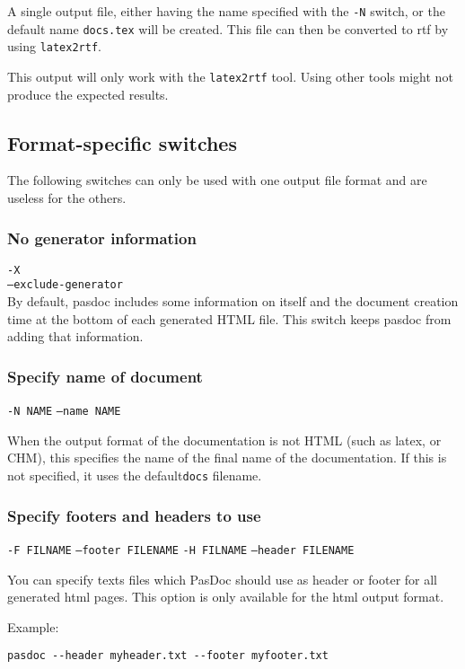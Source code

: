 \documentclass[11pt]{article}
\begin{document}
A single output file, either having the name specified with
the {\tt -N} switch, or the default name {\tt docs.tex} will
be created. This file can then be converted to rtf by using
{\tt latex2rtf}.

This output will only work with the {\tt latex2rtf} tool. Using
other tools might not produce the expected results. 

\subsection{Format-specific switches}

The following switches can only be used with one output file format
and are useless for the others.

\subsubsection{No generator information}

{\tt -X}\\
{\tt --exclude-generator}\\

By default, pasdoc includes some information on itself and the document
creation time at the bottom of each generated HTML file.
This switch keeps pasdoc from adding that information.

\subsubsection{Specify name of document}
{\tt -N NAME}
{\tt --name NAME}

When the output format of the documentation is not
HTML (such as latex, or CHM), this specifies the
name of the final name of the documentation. If this
is not specified, it uses the default{\tt  docs} 
filename.



\subsubsection{Specify footers and headers to use}

{\tt -F FILNAME}
{\tt --footer FILENAME}
{\tt -H FILNAME}
{\tt --header FILENAME}

You can specify texts files which PasDoc should use as header or footer 
for all generated html pages. This option is only available for
the html output format.

Example:
\begin{verbatim}
pasdoc --header myheader.txt --footer myfooter.txt
\end{verbatim}
\end{document}
